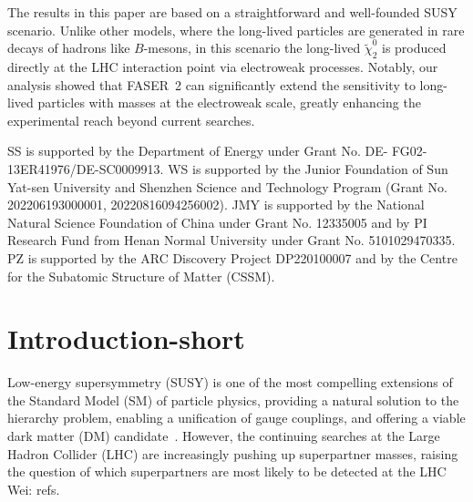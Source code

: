 \documentclass[letterpaper,11pt]{article}
\newcommand{\Wei}[1]{\textcolor{green2} {Wei: #1}}
\begin{document}
\par The results in this paper are based on a straightforward and well-founded SUSY scenario. Unlike other models, where the long-lived particles are generated in rare decays of hadrons like $B$-mesons, in this scenario the long-lived $\tilde{\chi}_2^0$ is produced directly at the LHC interaction point via electroweak processes. Notably, our analysis showed that FASER~2 can significantly extend the sensitivity to long-lived particles with masses at the electroweak scale, greatly enhancing the experimental reach beyond current searches.

\acknowledgments
SS is supported by the Department of Energy under Grant No. DE-
FG02-13ER41976/DE-SC0009913. 
WS is supported by the Junior Foundation of Sun Yat-sen University and Shenzhen Science and Technology Program (Grant No. 202206193000001,
20220816094256002). 
JMY is supported by the National Natural Science Foundation of China under Grant No. 12335005 and by PI Research Fund from Henan Normal University under Grant No. 5101029470335. 
PZ is supported by the ARC Discovery Project DP220100007 and by the Centre for the Subatomic Structure of Matter (CSSM).
\appendix

\newpage
\appendix
\section{Introduction-short}
Low-energy supersymmetry (SUSY) is one of the most compelling extensions of the Standard Model (SM) of particle physics, providing a natural solution to the hierarchy problem, enabling a unification of gauge couplings, and offering a viable dark matter (DM) candidate~\cite{Dreiner:2023yus, Martin:1997ns, Wang:2023suf, Haber:1984rc, Bae:2014yta}. However, the continuing searches at the Large Hadron Collider (LHC) are increasingly pushing up superpartner masses, raising the question of which superpartners are most likely to be detected at the LHC \Wei{refs}.
\end{document}
